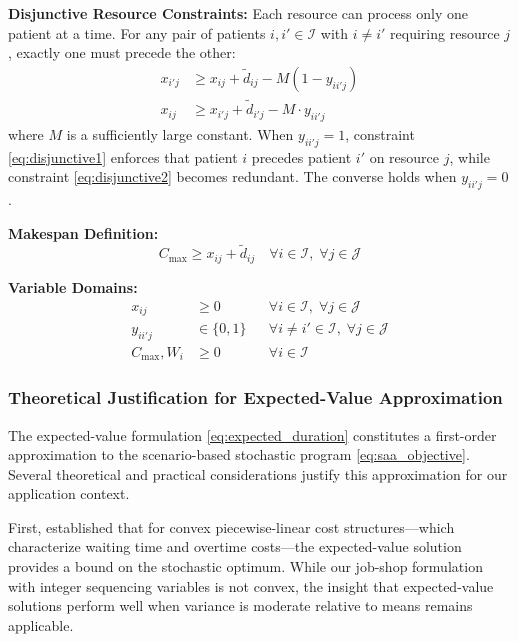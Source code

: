 \documentclass[11pt,a4paper]{article}
\begin{document}
\textbf{Disjunctive Resource Constraints:} Each resource can process only one patient at a time. For any pair of patients $i, i' \in \mathcal{I}$ with $i \neq i'$ requiring resource $j$, exactly one must precede the other:
\begin{align}
x_{i'j} &\geq x_{ij} + \tilde{d}_{ij} - M(1 - y_{ii'j}) \label{eq:disjunctive1} \\
x_{ij} &\geq x_{i'j} + \tilde{d}_{i'j} - M \cdot y_{ii'j} \label{eq:disjunctive2}
\end{align}
where $M$ is a sufficiently large constant. When $y_{ii'j} = 1$, constraint \eqref{eq:disjunctive1} enforces that patient $i$ precedes patient $i'$ on resource $j$, while constraint \eqref{eq:disjunctive2} becomes redundant. The converse holds when $y_{ii'j} = 0$.

\textbf{Makespan Definition:}
\begin{equation}
C_{\max} \geq x_{ij} + \tilde{d}_{ij} \quad \forall i \in \mathcal{I}, \; \forall j \in \mathcal{J}
\label{eq:makespan}
\end{equation}

\textbf{Variable Domains:}
\begin{align}
x_{ij} &\geq 0 && \forall i \in \mathcal{I}, \; \forall j \in \mathcal{J} \\
y_{ii'j} &\in \{0, 1\} && \forall i \neq i' \in \mathcal{I}, \; \forall j \in \mathcal{J} \\
C_{\max}, W_i &\geq 0 && \forall i \in \mathcal{I}
\end{align}

\subsubsection{Theoretical Justification for Expected-Value Approximation}

The expected-value formulation \eqref{eq:expected_duration} constitutes a first-order approximation to the scenario-based stochastic program \eqref{eq:saa_objective}. Several theoretical and practical considerations justify this approximation for our application context.

First, \citet{denton2003sequential} established that for convex piecewise-linear cost structures---which characterize waiting time and overtime costs---the expected-value solution provides a bound on the stochastic optimum. While our job-shop formulation with integer sequencing variables is not convex, the insight that expected-value solutions perform well when variance is moderate relative to means remains applicable.
\end{document}
